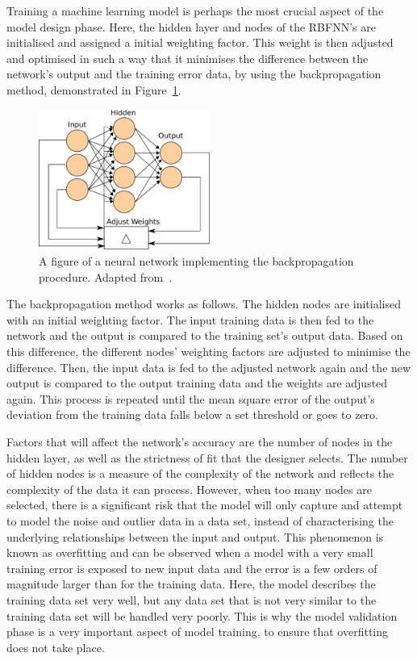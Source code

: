 Training a machine learning model is perhaps the most crucial aspect of the model design phase. Here, the hidden layer and nodes of the RBFNN's are initialised and assigned a initial weighting factor. This weight is then adjusted and optimised in such a way that it minimises the difference between the network's output and the training error data, by using the backpropagation method, demonstrated in Figure~\ref{fig:chap4-backprogagation}.

\begin{figure}
  \centering
  \includegraphics[width=0.5\textwidth]{figures/chapter4/backpropagation}
  \caption[A neural network implementing the backpropagation procedure.]{A figure of a neural network implementing the backpropagation procedure. Adapted from~\cite{ann-wiki-pic}.}
\label{fig:chap4-backprogagation}
\end{figure}

The backpropagation method works as follows. The hidden nodes are initialised with an initial weighting factor. The input training data is then fed to the network and the output is compared to the training set's output data. Based on this difference, the different nodes' weighting factors are adjusted to minimise the difference. Then, the input data is fed to the adjusted network again and the new output is compared to the output training data and the weights are adjusted again. This process is repeated until the mean square error of the output's deviation from the training data falls below a set threshold or goes to zero. 

Factors that will affect the network's accuracy are the number of nodes in the hidden layer, as well as the strictness of fit that the designer selects. The number of hidden nodes is a measure of the complexity of the network and reflects the complexity of the data it can process. However, when too many nodes are selected, there is a significant risk that the model will only capture and attempt to model the noise and outlier data in a data set, instead of characterising the underlying relationships between the input and output. This phenomenon is known as overfitting and can be observed when a model with a very small training error is exposed to new input data and the error is a few orders of magnitude larger than for the training data. Here, the model describes the training data set very well, but any data set that is not very similar to the training data set will be handled very poorly. This is why the model validation phase is a very important aspect of model training, to ensure that overfitting does not take place. 

